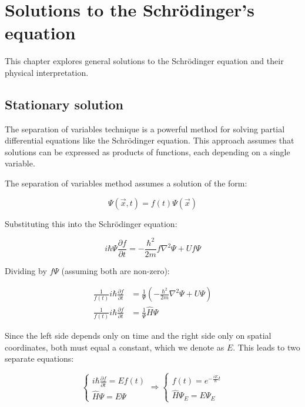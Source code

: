 \chapter{Solutions to the Schrödinger's equation}

This chapter explores general solutions to the Schrödinger equation and their physical interpretation.

\section{Stationary solution}

The separation of variables technique is a powerful method for solving partial differential equations like the Schrödinger equation. This approach assumes that solutions can be expressed as products of functions, each depending on a single variable.


The separation of variables method assumes a solution of the form:

\begin{equation}
\Psi(\vec{x}, t) = f(t)\Psi(\vec{x})
\end{equation}

Substituting this into the Schrödinger equation:

\begin{equation}
i\hbar\Psi\frac{\partial f}{\partial t} = -\frac{\hbar^2}{2m}f\nabla^2\Psi + Uf\Psi
\end{equation}

Dividing by $f\Psi$ (assuming both are non-zero):

\begin{align}
\frac{1}{f(t)}i\hbar\frac{\partial f}{\partial t} &= \frac{1}{\Psi}\left(-\frac{\hbar^2}{2m}\nabla^2\Psi + U\Psi\right) \\
\frac{1}{f(t)}i\hbar\frac{\partial f}{\partial t} &= \frac{1}{\Psi}\hat{H}\Psi
\end{align}

Since the left side depends only on time and the right side only on spatial coordinates, both must equal a constant, which we denote as $E$. This leads to two separate equations:

\[
\left\{\begin{array}{l}
i\hbar\frac{\partial f}{\partial t} = Ef(t) \\
\hat{H}\Psi = E\Psi
\end{array}\right. \Rightarrow \left\{\begin{array}{l}
f(t) = e^{-\frac{iE}{\hbar}t} \\
\hat{H}\Psi_E = E\Psi_E
\end{array}\right.
\]

